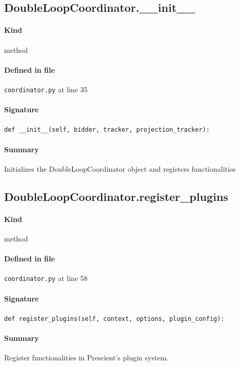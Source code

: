 \documentclass[11pt]{report}
\begin{document}
\subsection{DoubleLoopCoordinator.\_\_init\_\_}
\label{def:coordinator.py:DoubleLoopCoordinator.__init__:L35}
\paragraph{Kind} method
\paragraph{Defined in file} \texttt{coordinator.py} at line 35
\paragraph{Signature} \texttt{def \_\_init\_\_(self, bidder, tracker, projection\_tracker):}
\paragraph{Summary} Initializes the DoubleLoopCoordinator object and registers functionalities
\subsection{DoubleLoopCoordinator.register\_plugins}
\label{def:coordinator.py:DoubleLoopCoordinator.register_plugins:L58}
\paragraph{Kind} method
\paragraph{Defined in file} \texttt{coordinator.py} at line 58
\paragraph{Signature} \texttt{def register\_plugins(self, context, options, plugin\_config):}
\paragraph{Summary} Register functionalities in Prescient's plugin system.
\end{document}
